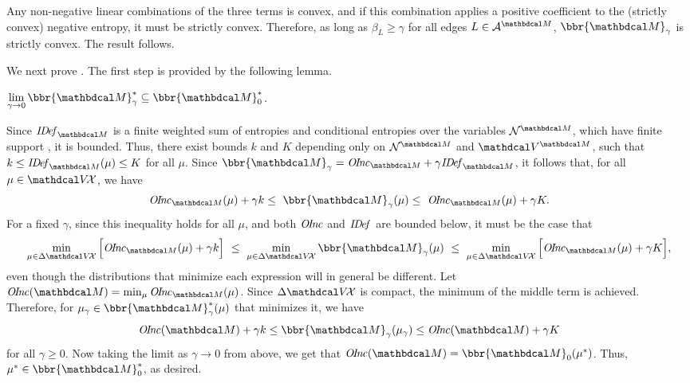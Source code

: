 \begin{subappendices}
\begin{lproof}
			Any non-negative linear combinations of the three
			terms is convex, and if this combination applies a
			positive coefficient to the (strictly convex) negative entropy,
			it must be strictly convex. Therefore, as
			long as $\beta_L \geq \gamma$ for all edges $L \in
			\Ar^{\dg M}$, $\bbr{\dg M}_\gamma$ is
strictly convex.  The result follows.
\end{lproof}


We next prove .  The first step is provided by the
following lemma.
\begin{lemma}\label{lem:gamma2zero}
 $\lim\limits_{\gamma\to0}\bbr{\dg M}_\gamma^* \subseteq \bbr{\dg M}_0^*$. 
\end{lemma}
\begin{lproof}\label{proof:gamma2zero}
\def\lb{k}
\def\ub{K}  

Since $\IDef_{\dg M}$ is a finite weighted sum of entropies
and conditional entropies over the variables $\N^{\dg M}$, which have
finite support%
, it is bounded.
Thus, there exist bounds $k$ and $K$ depending only on $\N^{\dg M}$ and
$\V^{\dg M}$, such that $\lb \leq \IDef_{\dg M}(\mu) \leq \ub$ for all $\mu$.
Since $\bbr{\dg M}_\gamma = \OInc_{\dg M} + \gamma \IDef_{\dg M}$,
it follows that, for all $\mu \in \V\!\X$, we have
\[ \OInc_{\dg M}( \mu) + \gamma\lb \leq~ \bbr{\dg M }_\gamma(\mu) 
\leq~  \OInc_{\dg M}( \mu) + \gamma\ub. \]
For a fixed $\gamma$, since this inequality holds for all $\mu$, and
both $\mathit{O\mskip-2.5muI\mskip-3.5mun\mskip-1.7muc}$ and $\mathit{I\mskip-3.0muD\mskip-2.5mue\mskip-1.5muf}_{}$ are bounded below, it must be the case that  
\[
\min_{\mu \in \Delta\V\!\X} \Big[ \OInc_{\dg M}( \mu) + \gamma\lb \Big]
~\leq~ \min_{\mu \in \Delta\V\!\X}\bbr{\dg M }_\gamma(\mu) ~\leq~
\min_{\mu \in \Delta\V\!\X} \Big[ \OInc_{\dg M}( \mu) + \gamma\ub
    \Big], \] 
even though the distributions that minimize each expression will in general be different.
Let $\OInc(\dg M) = \min_{\mu} \OInc_{\dg M}(\mu)$.
Since $\Delta\V\!\X$ is compact, the minimum of the middle term is
achieved.  
Therefore, for $\mu_\gamma \in \bbr{\dg M}^*_\gamma(\mu)$ that
minimizes it, we have 
$$\OInc(\dg M) +\gamma \lb \le \bbr{\dg M }_\gamma(\mu_\gamma) \le
		 \OInc(\dg M) +\gamma \ub$$ for all $\gamma \ge 0.$
Now taking the limit as $\gamma\rightarrow 0$ from above, we get that
$\OInc(\dg M) = \bbr{\dg M }_0(\mu^*)$.
Thus, $\mu^* \in \bbr{\dg M}_0^*$, as desired.
\end{lproof}


\end{subappendices}
